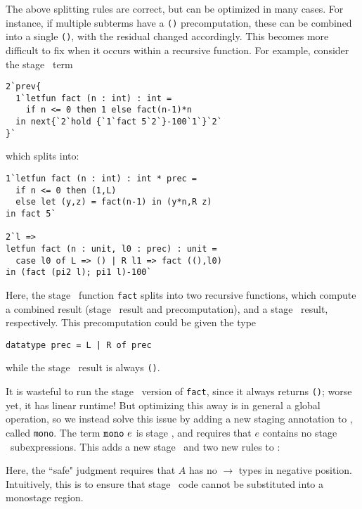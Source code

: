 The above splitting rules are correct, but can be optimized in many cases. 
For instance, if multiple subterms have a \texttt{()} precomputation, these can be
combined into a single \texttt{()}, with the residual changed accordingly.
This becomes more difficult to fix when it occurs within a recursive function.
For example, consider the stage \bbtwo\ term
\begin{lstlisting}
2`prev{
  1`letfun fact (n : int) : int = 
    if n <= 0 then 1 else fact(n-1)*n
  in next{`2`hold {`1`fact 5`2`}-100`1`}`2`
}`
\end{lstlisting}
which splits into:
\begin{lstlisting}
1`letfun fact (n : int) : int * prec = 
  if n <= 0 then (1,L) 
  else let (y,z) = fact(n-1) in (y*n,R z)
in fact 5`

2`l => 
letfun fact (n : unit, l0 : prec) : unit = 
  case l0 of L => () | R l1 => fact ((),l0)
in (fact (pi2 l); pi1 l)-100`
\end{lstlisting}
Here, the stage \bbone\ function \texttt{fact} splits into two recursive
functions, which compute a combined result (stage \bbone\ result and
precomputation), and a stage \bbtwo\ result, respectively. This precomputation
could be given the type
\begin{lstlisting}
datatype prec = L | R of prec
\end{lstlisting}
while the stage \bbtwo\ result is always \texttt{()}.

It is wasteful to run the stage \bbtwo\ version of \texttt{fact}, since it
always returns \texttt{()}; worse yet, it has linear runtime!
But optimizing this away is in general a global operation,
so we instead solve this issue by adding a new staging annotation to \lang, called
\texttt{mono}. The term ${\tt mono}~e$ is stage \bbone, and requires that $e$ contains
no stage \bbtwo\ subexpressions. This adds a new stage \bbmono\ and two new
rules to \lang:
Here, the ``safe" judgment requires that $A$ has no $\to$ types in negative position.
Intuitively, this is to ensure that stage \bbtwo\ code cannot be substituted into a monostage region.

